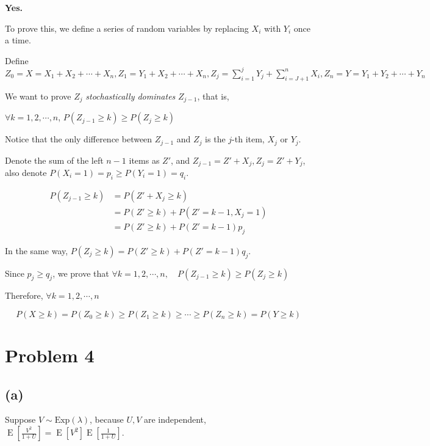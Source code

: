 \documentclass{article}
\begin{document}
\textbf{Yes.}

To prove this, we define a series of random variables by replacing $X_i$ with $Y_i$ once a time. 

Define $Z_0 =X =  X_1+X_2+\cdots+X_n, Z_1 = Y_1 + X_2 + \cdots +X_n, Z_j= \sum_{i=1}^{j} Y_j + \sum_{i=J+1}^{n} X_i, Z_n = Y = Y_1+ Y_2 +\cdots+Y_n$

We want to prove $Z_{j}$ \textit{stochastically dominates} $Z_{j-1}$, that is,

$\forall k = 1,2,\cdots,n$, $P(Z_{j-1}\geqslant k) \geqslant P(Z_j\geqslant k)$

Notice that the only difference between $Z_{j-1}$ and $Z_j$ is the $j$-th item, $X_{j}$ or $Y_{j}$. 

Denote the sum of the left $n-1$ items as $Z'$, and $Z_{j-1} = Z'+X_{j},Z_{j}=Z'+Y_{j}$, also denote $P(X_{i} =1) = p_i \geqslant P(Y_{i} =1) = q_i$.

\begin{equation}
\begin{aligned}
    P(Z_{j-1}\geqslant k) &=  P(Z'+X_j \geqslant k) \\ &= P(Z'\geqslant k) + P(Z' = k-1,X_j=1) \\ &= P(Z'\geqslant k)+ P(Z' = k-1)p_j 
\end{aligned}
\end{equation}

In the same way, $ P(Z_{j}\geqslant k) = P(Z'\geqslant k)+ P(Z' = k-1)q_j $.

Since $p_j \geqslant q_j$, we prove that $\forall k = 1,2,\cdots,n,\quad P(Z_{j-1}\geqslant k) \geqslant P(Z_j\geqslant k)$


Therefore, $\forall k = 1,2,\cdots,n$

\begin{equation}
    P(X\geqslant k) = P(Z_{0}\geqslant k) \geqslant P(Z_{1}\geqslant k) \geqslant \cdots \geqslant P(Z_{n}\geqslant k) = P(Y \geqslant k)
\end{equation}

\section{Problem 4}

\subsection{(a)}

Suppose $V \sim \text{Exp}(\lambda)$, because $U,V$ are independent, $\operatorname{E}\left[\frac{V^2}{1+U}\right]= \operatorname{E}[V^2] \operatorname{E}\left[\frac{1}{1+U}\right]$.
\end{document}
